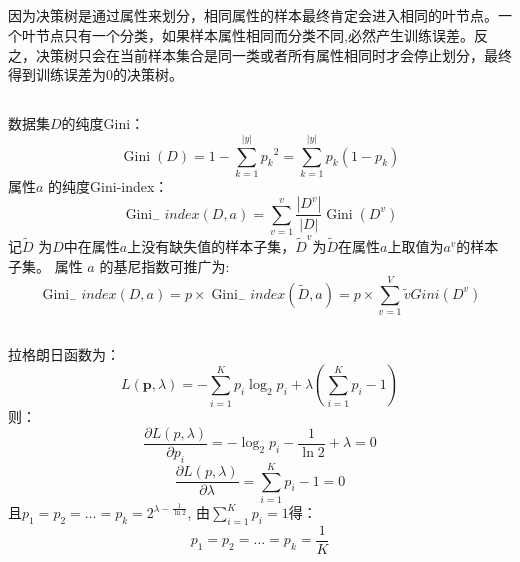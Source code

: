 \documentclass[UTF8,a4paper,AutoFakeBold,AutoFakeSlant]{article}
\begin{document}
\subsection{}

因为决策树是通过属性来划分，相同属性的样本最终肯定会进入相同的叶节点。一个叶节点只有一个分类，如果样本属性相同而分类不同,必然产生训练误差。反之，决策树只会在当前样本集合是同一类或者所有属性相同时才会停止划分，最终得到训练误差为0的决策树。



\subsection{}

数据集$D$的纯度Gini：
\begin{equation*}
  \operatorname{Gini}(D)=1-\sum_{k=1}^{|y|}{{p_{k}}}^{2} = \sum_{k=1}^{|y|}{{p_{k}}}(1-p_k)
\end{equation*}
属性$a$ 的纯度Gini-index：
\begin{equation*}
  \operatorname{Gini}_{-} index(D,a) = \sum_{v=1}^{v} \frac{\left|D^{v}\right|}{|D|} \operatorname{Gini}\left(D^{v}\right)
\end{equation*}
记$\tilde{D}$ 为$D$中在属性$a$上没有缺失值的样本子集，$\tilde{D}^v$为$\tilde{D}$在属性$a$上取值为$a^v$的样本子集。
属性  $a$  的基尼指数可推广为:
\begin{equation*}
  \operatorname{Gini}_{-} index  (D, a)=p \times \operatorname{Gini}_{-} index(\tilde{D}, a)=p \times \sum_{v=1}^{V} \tilde{v} G i n i\left(D^{v}\right)
\end{equation*}



\subsection{}

拉格朗日函数为：
\begin{equation*}
  L(\boldsymbol{p}, \lambda)=-\sum_{i=1}^{K} p_{i} \log _{2} p_{i}+\lambda\left(\sum_{i=1}^{K} p_{i}-1\right)
\end{equation*}
则：
\begin{equation*}
  \frac{\partial L(p, \lambda)}{\partial p_{i}}=-\log _{2} p_{i}-\frac{1}{\ln 2}+\lambda=0
\end{equation*}
\begin{equation*}
  \frac{\partial L(p, \lambda)}{\partial \lambda}=\sum_{i=1}^{K} p_{i}-1=0
\end{equation*}
且$ p_1=p_2=\dots=p_k=2^{\lambda-\frac{1}{\ln 2}} $,
由$ \sum_{i=1}^Kp_i=1 $得：
\begin{equation*}
  p_1=p_2=\dots=p_k=\frac{1}{K}
\end{equation*}
\end{document}
